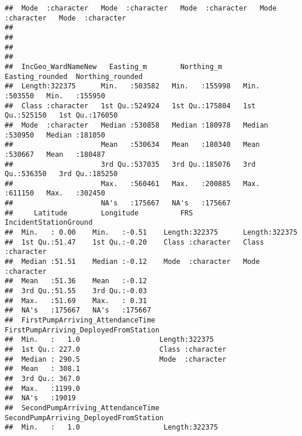 \documentclass[
]{article}
\begin{document}
\begin{verbatim}
##  Mode  :character   Mode  :character   Mode  :character   Mode  :character   Mode  :character  
##                                                                                                
##                                                                                                
##                                                                                                
##                                                                                                
##  IncGeo_WardNameNew   Easting_m        Northing_m     Easting_rounded  Northing_rounded
##  Length:322375      Min.   :503582   Min.   :155998   Min.   :503550   Min.   :155950  
##  Class :character   1st Qu.:524924   1st Qu.:175804   1st Qu.:525150   1st Qu.:176050  
##  Mode  :character   Median :530858   Median :180978   Median :530950   Median :181050  
##                     Mean   :530634   Mean   :180340   Mean   :530667   Mean   :180487  
##                     3rd Qu.:537035   3rd Qu.:185076   3rd Qu.:536350   3rd Qu.:185250  
##                     Max.   :560461   Max.   :200885   Max.   :611150   Max.   :302450  
##                     NA's   :175667   NA's   :175667                                    
##     Latitude        Longitude          FRS            IncidentStationGround
##  Min.   : 0.00    Min.   :-0.51    Length:322375      Length:322375        
##  1st Qu.:51.47    1st Qu.:-0.20    Class :character   Class :character     
##  Median :51.51    Median :-0.12    Mode  :character   Mode  :character     
##  Mean   :51.36    Mean   :-0.12                                            
##  3rd Qu.:51.55    3rd Qu.:-0.03                                            
##  Max.   :51.69    Max.   : 0.31                                            
##  NA's   :175667   NA's   :175667                                           
##  FirstPumpArriving_AttendanceTime FirstPumpArriving_DeployedFromStation
##  Min.   :   1.0                   Length:322375                        
##  1st Qu.: 227.0                   Class :character                     
##  Median : 290.5                   Mode  :character                     
##  Mean   : 308.1                                                        
##  3rd Qu.: 367.0                                                        
##  Max.   :1199.0                                                        
##  NA's   :19019                                                         
##  SecondPumpArriving_AttendanceTime SecondPumpArriving_DeployedFromStation
##  Min.   :   1.0                    Length:322375                         

\end{verbatim}
\end{document}
